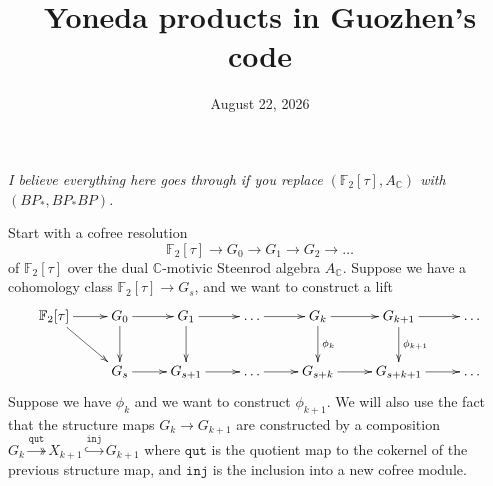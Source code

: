 \documentclass[11pt]{amsart}
\begin{document}
\parskip=0.2in \parindent=0in

\newcommand{\F}{\mathbb{F}}
\newcommand{\C}{\mathbb{C}}
\renewcommand{\Im}{\operatorname{Im}}
\renewcommand{\l}{\overset}
\newcommand{\into}{\hookrightarrow}
\newcommand{\onto}{\twoheadrightarrow}
\newcommand{\tto}{\longrightarrow}
\newcommand{\too}[1]{\overset{#1}\to}
\newcommand{\intoo}[1]{\overset{#1}\into}
\newcommand{\ontoo}[1]{\overset{#1}\onto}
\newcommand{\mapstoo}[1]{\overset{#1}\mapsto}
\newcommand{\bto}{\leftarrow}
\newcommand{\isom}{\cong}
\newcommand{\dsum}{\oplus}
\newcommand{\dsums}{\bigoplus}
\newcommand{\tensor}{\otimes}
\newcommand{\Hom}{\operatorname{Hom}}
\renewcommand{\u}{\underbracket[0.7pt]} %

\newcommand{\inj}{\mathtt{inj}}
\newcommand{\injindex}{\mathtt{inj}\underline{\ }\mathtt{index}}
\newcommand{\inverseind}{\mathtt{inverse}\underline{\ }\mathtt{ind}}
\newcommand{\qut}{\mathtt{qut}}
\newcommand{\phibar}{\bar{\phi}}

\theoremstyle{gloss}
\newtheorem*{defstar}{Definition}
\newtheorem{theorem}{Theorem}

\theoremstyle{newplain}

\newtheorem{corollary}[theorem]{Corollary}
\newtheorem{claim}[theorem]{Claim}
\newtheorem{lemma}[theorem]{Lemma}
\newtheorem{proposition}[theorem]{Proposition}
\newtheorem{fact}[theorem]{Fact}

\theoremstyle{newtextthm}
\newtheorem{definition}[theorem]{Definition}
\newtheorem{example}[theorem]{Example}
\newtheorem{problem}[theorem]{Problem}
\newtheorem{remark}[theorem]{Remark}
\newtheorem{notation}[theorem]{Notation}


\title{Yoneda products in Guozhen's code}
\date{August 22, 2026}
\maketitle

\textit{I believe everything here goes through if you replace $(\F_2[\tau],
A_\C)$ with $(BP_*, BP_*BP)$.}


Start with a cofree resolution
$$ \F_2[\tau] \to G_0 \to G_1\to G_2 \to \dots $$
of $\F_2[\tau]$ over the dual $\C$-motivic Steenrod algebra $A_\C$.
Suppose we have a cohomology class $\F_2[\tau]\to G_s$, and we want to construct a lift
$$ \xymatrix{
\F_2[\tau]\ar[r]\ar[rd] & G_0\ar[r]\ar[d] & G_1\ar[r]\ar[d] & \dots\ar[r] & G_k\ar[d]^-{\phi_k}\ar[r] &
G_{k+1}\ar[d]^-{\phi_{k+1}}\ar[r] & \dots
\\ & G_s\ar[r] & G_{s+1}\ar[r] & \dots\ar[r] & G_{s+k}\ar[r] & G_{s+k+1}\ar[r] & \dots
}$$
Suppose we have $\phi_k$ and we want to construct $\phi_{k+1}$. We will also
use the fact that the structure maps $G_k\to G_{k+1}$ are constructed by a
composition $G_k\ontoo{\qut} X_{k+1}\intoo{\inj} G_{k+1}$ where $\qut$ is the
quotient map to the cokernel of the previous structure map, and $\inj$ is the
inclusion into a new cofree module.
\end{document}
